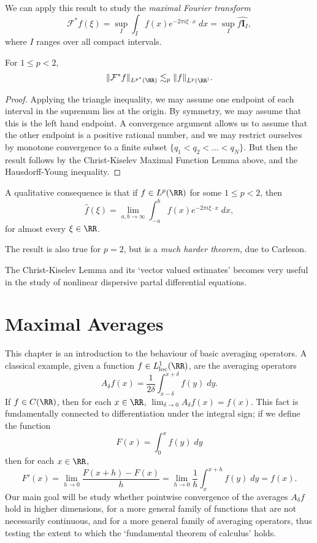 We can apply this result to study the \emph{maximal Fourier transform}
%
\[ \mathcal{F}^* f(\xi) = \sup_I \int_I f(x) e^{-2 \pi i \xi \cdot x}\; dx = \sup_I \widehat{f \mathbf{I}_I}, \]
%
where $I$ ranges over all compact intervals.

\begin{theorem}
    For $1 \leq p < 2$,
    \[ \| \mathcal{F}^* f \|_{L^{p^*}(\RR)} \lesssim_p \| f \|_{L^p(\RR^)}. \]
\end{theorem}
\begin{proof}
    Applying the triangle inequality, we may assume one endpoint of each interval in the supremum lies at the origin. By symmetry, we may assume that this is the left hand endpoint. A convergence argument allows us to assume that the other endpoint is a positive rational number, and we may restrict ourselves by monotone convergence to a finite subset $\{ q_1 < q_2 < \dots < q_N \}$. But then the result follows by the Christ-Kiselev Maximal Function Lemma above, and the Hausdorff-Young inequality.
\end{proof}

A qualitative consequence is that if $f \in L^p(\RR)$ for some $1 \leq p < 2$, then
%
\[ \widehat{f}(\xi) = \lim_{a,b \to \infty} \int_{-a}^b f(x) e^{-2 \pi i \xi \cdot x}\; dx, \]
%
for almost every $\xi \in \RR$.

\begin{remark}
    The result is also true for $p = 2$, but is a \emph{much harder theorem}, due to Carleson.
\end{remark}

The Christ-Kiselev Lemma and its `vector valued estimates' becomes very useful in the study of nonlinear dispersive partal differential equations.








\chapter{Maximal Averages}

This chapter is an introduction to the behaviour of basic averaging operators. A classical example, given a function $f \in L^1_{\text{loc}}(\RR)$, are the averaging operators
%
\[ A_\delta f(x) = \frac{1}{2\delta} \int_{x-\delta}^{x+\delta} f(y)\; dy. \]
%
If $f \in C(\RR)$, then for each $x \in \RR$, $\lim_{\delta \to 0} A_\delta f(x) = f(x)$. This fact is fundamentally connected to differentiation under the integral sign; if we define the function
%
\[ F(x) = \int_0^x f(y)\; dy \]
%
then for each $x \in \RR$,
%
\[ F'(x) = \lim_{h \to 0} \frac{F(x+h) - F(x)}{h} = \lim_{h \to 0} \frac{1}{h} \int_x^{x+h} f(y)\; dy = f(x). \]
%
Our main goal will be study whether pointwise convergence of the averages $A_\delta f$ hold in higher dimensions, for a more general family of functions that are not necessarily continuous, and for a more general family of averaging operators, thus testing the extent to which the `fundamental theorem of calculus' holds.

